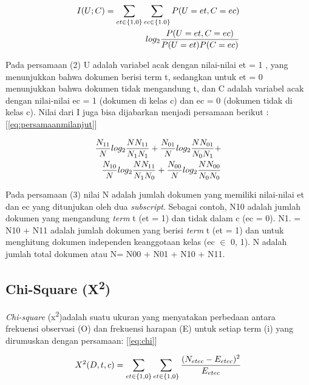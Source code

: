 \begin{equation}
\begin{split}
\tiny
I(U;C) = \sum\limits_{et\in\{1,0\}}\sum\limits_{ec\in\{1.0\}} P(U = et, C = ec) \\
log_2 \frac{P(U = et,C =ec)}{P(U = et)P(C = ec)} 
\label{eq:persamaanmi}
\normalsize
\end{split}
\end{equation}

Pada persamaan (2) U adalah variabel acak dengan nilai-nilai et = 1 , yang menunjukkan bahwa dokumen berisi term t, sedangkan untuk et = 0 menunjukkan bahwa dokumen tidak mengandung t, dan C adalah variabel acak dengan nilai-nilai ec = 1 (dokumen di kelas c) dan ec = 0 (dokumen tidak di kelas c). Nilai dari I juga bisa dijabarkan menjadi persamaan berikut : [\ref{eq:persamaanmilanjut}]

\begin{equation}
\begin{split}
\tiny
\frac{N_{11}}{N}log_2\frac{NN_{11}}{N_1N_1} + \frac{N_{01}}{N}log_2\frac{NN_{01}}{N_0N_1} + \\
\frac{N_{10}}{N}log_2\frac{NN_{11}}{N_1N_0} + \frac{N_{00}}{N}log_2\frac{NN_{00}}{N_0N_0}
\label{eq:persamaanmilanjut}
\normalsize
\end{split}
\end{equation}

Pada persamaan (3) nilai N adalah jumlah dokumen yang memiliki nilai-nilai et dan ec yang ditunjukan oleh dua \textit{subscript}. Sebagai contoh, N10 adalah jumlah dokumen yang mengandung \textit{term} t (et = 1) dan tidak dalam c (ec = 0). N1. = N10 + N11 adalah jumlah dokumen yang berisi \textit{term} t (et = 1) dan untuk menghitung dokumen independen keanggotaan kelas (ec $\in$ {0, 1}). N adalah jumlah total dokumen atau N= N00 + N01 + N10 + N11. 

\subsection*{Chi-Square (X\textsuperscript{2})}
\textit{Chi-square}  (x\textsuperscript{2})adalah suatu ukuran yang menyatakan perbedaan antara frekuensi observasi (O) dan frekuensi harapan (E) untuk setiap term (i) yang dirumuskan dengan persamaan: [\ref{eq:chi}]

\begin{equation}
\begin{split}
\tiny
X^2(D, t, c) = \sum\limits_{et\in\{1,0\}}\sum\limits_{et\in\{1,0\}} \frac{(N_{etec} - E_{etec})^2}{E_{etec}}
\label{eq:chi}
\normalsize
\end{split}
\end{equation}

